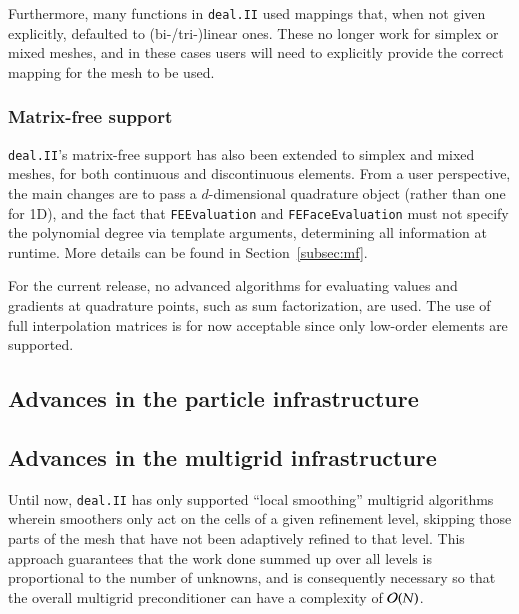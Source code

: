 \documentclass{ansarticle-preprint}
\newcommand{\specialword}[1]{\texttt{#1}}
\newcommand{\dealii}{{\specialword{deal.II}}\xspace}
\begin{document}
Furthermore, many functions in \dealii{} used mappings that, when not
given explicitly, defaulted to (bi-/tri-)linear ones. These no longer
work for simplex or mixed meshes, and in these cases users will need
to explicitly provide the correct mapping for the mesh to be used.


\subsubsection{Matrix-free support}

\dealii{}'s matrix-free support has also been extended to simplex and
mixed meshes, for both
continuous and discontinuous elements. From a user perspective, the main
changes are to pass a $d$-dimensional quadrature object (rather than
one for 1D),
and the fact that \texttt{FEEvaluation} and \texttt{FEFaceEvaluation} must not
specify the polynomial degree via template arguments, determining all
information at runtime. More details can be found in
Section~\ref{subsec:mf}.

For the current release, no advanced algorithms for evaluating values and
gradients at quadrature points, such as sum factorization, are used.
The use of full interpolation matrices is for now acceptable since only low-order elements are
supported.



\subsection{Advances in the particle infrastructure}
\label{subsec:particles}



\subsection{Advances in the multigrid infrastructure}
\label{subsec:mg}

Until now, \dealii has only supported ``local smoothing'' multigrid
algorithms~\citep{ClevengerHeisterKanschatKronbichler2019} wherein
smoothers only act on the cells of a given refinement level,
skipping those parts of the mesh that have not been adaptively refined
to that level. This approach guarantees that the work done summed up
over all levels is proportional to the number of unknowns, and is
consequently necessary so that the overall multigrid preconditioner
can have a complexity of ${\cal O}(N)$.
\end{document}
